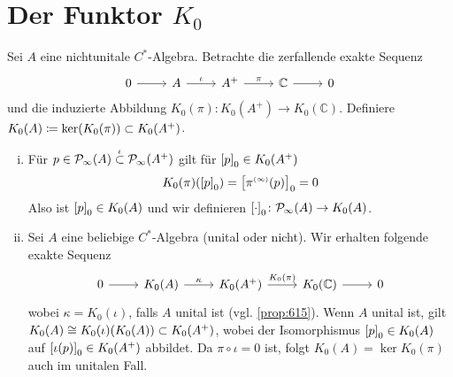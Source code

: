 \section{Der Funktor $K_0$} %
\label{sec:7}

\begin{definition}
	Sei $A$ eine nichtunitale $C^*$-Algebra.
	Betrachte die zerfallende exakte Sequenz
	\[
		\begin{tikzcd}
			0 \rar & A \rar["\iota"] & A^+ \rar["\pi"] & \mathbb{C} \rar & 0
		\end{tikzcd}
	\]
	und die induzierte Abbildung $K_0(\pi) \colon K_0(A^+) \to K_0(\mathbb{C})$.
	Definiere $K_0(A) \coloneqq \ker \enbrace*{K_0(\pi)} \subset K_0(A^+)$.
\end{definition}

\begin{bemerkung}
	\begin{enumerate}[(i)]
		\item Für $p \in \Pinfty(A) \stackrel{\iota}{\subset} \Pinfty(A^+)$ gilt für $\benbrace*{p}_0 \in K_0(A^+)$
		\[
			K_0(\pi) \enbrace*{\benbrace*{p}_0} = \benbrace[\big]{\pi^\ssbrace{\infty}(p)}_0 =0
		\]
		Also ist $\benbrace*{p}_0 \in K_0(A)$ und wir definieren $\benbrace*{\cdot}_0 \colon \Pinfty(A) \to K_0(A)$.
		\item Sei $A$ eine beliebige $C^*$-Algebra (unital oder nicht).
		Wir erhalten folgende exakte Sequenz
		\[
			\begin{tikzcd}
				0 \rar & K_0(A) \rar["\kappa"] & K_0(A^+) \rar["K_0(\pi)"] & K_0(\mathbb{C})  \rar & 0
			\end{tikzcd}
		\]
		wobei $\kappa = K_0(\iota)$, falls $A$ unital ist (vgl. \autoref{prop:615}).
		Wenn $A$ unital ist, gilt $K_0(A) \cong K_0(\iota) \enbrace*{K_0(A)} \subset K_0(A^+)$, wobei der Isomorphismus $\benbrace*{p}_0 \in K_0(A)$ auf $ \benbrace*{\iota(p)}_0 \in K_0(A^+)$ abbildet.
		Da $\pi \circ \iota =0$ ist, folgt $K_0(A) = \ker K_0(\pi)$ auch im unitalen Fall.
	\end{enumerate}
\end{bemerkung}

